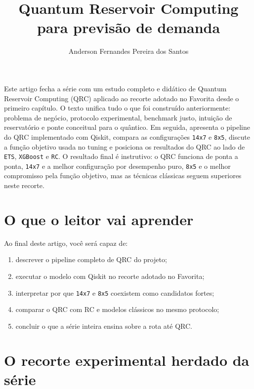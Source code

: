\documentclass[12pt]{article}
\title{Quantum Reservoir Computing para previsão de demanda}
\author{Anderson Fernandes Pereira dos Santos}
\providecommand{\tightlist}{%
              \setlength{\itemsep}{0pt}\setlength{\parskip}{0pt}}
\begin{document}
            \maketitle

            \begin{resumo}
            Este artigo fecha a série com um estudo completo e didático de Quantum Reservoir Computing (QRC) aplicado ao recorte adotado no Favorita desde o primeiro capítulo. O texto unifica tudo o que foi construído anteriormente: problema de negócio, protocolo experimental, benchmark justo, intuição de reservatório e ponte conceitual para o quântico. Em seguida, apresenta o pipeline do QRC implementado com Qiskit, compara as configurações \texttt{14x7} e \texttt{8x5}, discute a função objetivo usada no tuning e posiciona os resultados do QRC ao lado de \texttt{ETS}, \texttt{XGBoost} e \texttt{RC}. O resultado final é instrutivo: o QRC funciona de ponta a ponta, \texttt{14x7} e a melhor configuração por desempenho puro, \texttt{8x5} e o melhor compromisso pela função objetivo, mas as técnicas clássicas seguem superiores neste recorte.
            \end{resumo}

            \section{O que o leitor vai aprender}\label{1-o-que-o-leitor-vai-aprender}

Ao final deste artigo, você será capaz de:

\begin{enumerate}
\def\labelenumi{\arabic{enumi}.}
\tightlist
\item
  descrever o pipeline completo de QRC do projeto;
\item
  executar o modelo com Qiskit no recorte adotado no Favorita;
\item
  interpretar por que \texttt{14x7} e \texttt{8x5} coexistem como candidatos fortes;
\item
  comparar o QRC com RC e modelos clássicos no mesmo protocolo;
\item
  concluir o que a série inteira ensina sobre a rota até QRC.
\end{enumerate}

\section{O recorte experimental herdado da série}\label{2-o-recorte-experimental-herdado-da-suxe9rie}
\end{document}

